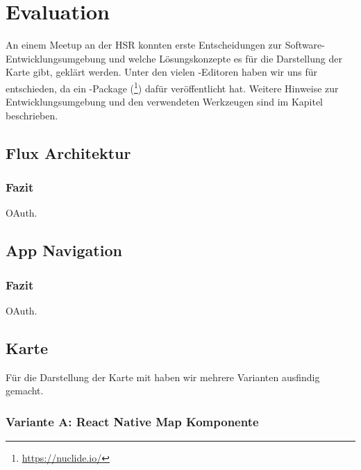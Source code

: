 \chapter{Evaluation}
\label{tb-evaluation}
An einem  Meetup an der HSR konnten erste Entscheidungen zur Software-Entwicklungsumgebung und welche Lösungskonzepte es für die Darstellung der Karte gibt, geklärt werden.
Unter den vielen -Editoren haben wir uns für  entschieden, da  ein -Package (\footnote{\url{https://nuclide.io/}}) dafür veröffentlicht hat. 
Weitere Hinweise zur Entwicklungsumgebung und den verwendeten Werkzeugen sind im Kapitel  beschrieben.


\section{Flux Architektur}

\subsection{Fazit}
OAuth.

\section{App Navigation}

\subsection{Fazit}
OAuth.

\section{Karte}

Für die Darstellung der Karte mit  haben wir mehrere Varianten ausfindig gemacht.

\subsection{Variante A: React Native Map Komponente}

